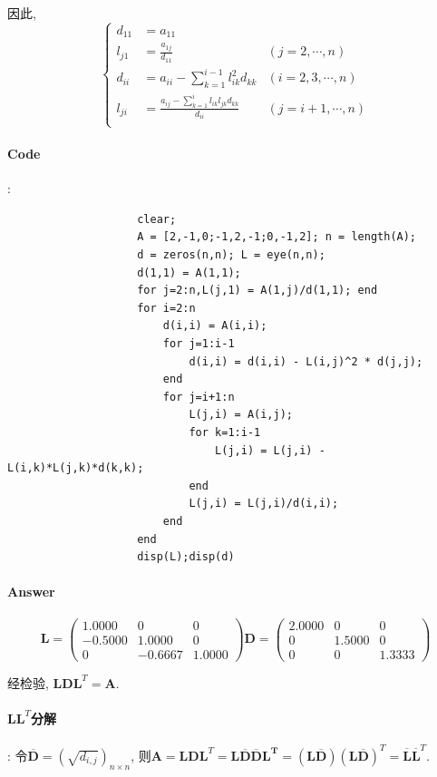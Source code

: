 \documentclass{article}
\begin{document}
\begin{CJK*}{UTF8}{song}
				 因此,
				 $$\left\{
				 	\begin{aligned}
				 		d_{11} &= a_{11} &\\ 
				 		l_{j1} &= \frac{a_{1j}}{d_{11}} &\left(j=2,\cdots,n\right)\\
				 		d_{ii} &= a_{ii} - \sum_{k=1}^{i-1}l_{ik}^2d_{kk} &\left( i=2,3,\cdots,n\right) \\
				 		l_{ji} &= \frac{a_{ij} - \sum_{k=1}^{i}l_{ik}l_{jk}d_{kk}}{d_{ii}} &\left(j=i+1,\cdots,n\right) \\
				 	\end{aligned}
				 \right. $$
			\paragraph{Code}:\newline
				\begin{lstlisting}
					clear;
					A = [2,-1,0;-1,2,-1;0,-1,2]; n = length(A);
					d = zeros(n,n); L = eye(n,n);
					d(1,1) = A(1,1);
					for j=2:n,L(j,1) = A(1,j)/d(1,1); end
					for i=2:n
						d(i,i) = A(i,i);
						for j=1:i-1
							d(i,i) = d(i,i) - L(i,j)^2 * d(j,j);
						end
						for j=i+1:n
							L(j,i) = A(i,j);
							for k=1:i-1
								L(j,i) = L(j,i) - L(i,k)*L(j,k)*d(k,k);
							end
							L(j,i) = L(j,i)/d(i,i);
						end
					end
					disp(L);disp(d)
				\end{lstlisting}
			\paragraph{Answer}
				$$\mathbf{L} = \left(
					\begin{matrix}
						1.0000    &     0      &   0 \\
						-0.5000  &  1.0000    &     0 \\
						0  & -0.6667   & 1.0000
					\end{matrix}
				\right)
				\mathbf{D} = \left(
					\begin{matrix}
						2.0000      &   0    &     0 \\
						0  &  1.5000     &    0 \\
						0   &      0 &   1.3333
					\end{matrix}
				\right)
				$$
				
				经检验, $\mathbf{LDL}^T = \mathbf{A}$.
			\paragraph{$\mathbf{LL}^T$分解} :\newline
				令$\mathbf{\overline{D}} = \left(\sqrt{d_{i,j}}\right)_{n \times n}$,
				 则$\mathbf{A} = \mathbf{LDL}^{T} = \mathbf{L\overline{D}\overline{D}L^T} = \left(\mathbf{L\overline{D}}\right)\left(\mathbf{L\overline{D}}\right)^T = \mathbf{\overline{L}}  \mathbf{\overline{L}}^T$.
				

\end{CJK*}
\end{document}
